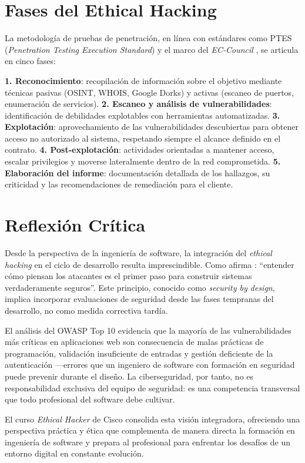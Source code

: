 \documentclass[12pt, a4paper]{article}
\begin{document}
\section{Fases del Ethical Hacking}

La metodología de pruebas de penetración, en línea con estándares como PTES (\textit{Penetration Testing Execution Standard}) y el marco del \textit{EC-Council} \citep{EC-Council2022}, se articula en cinco fases:

\textbf{1. Reconocimiento}: recopilación de información sobre el objetivo mediante técnicas pasivas (OSINT, WHOIS, Google Dorks) y activas (escaneo de puertos, enumeración de servicios). \textbf{2. Escaneo y análisis de vulnerabilidades}: identificación de debilidades explotables con herramientas automatizadas. \textbf{3. Explotación}: aprovechamiento de las vulnerabilidades descubiertas para obtener acceso no autorizado al sistema, respetando siempre el alcance definido en el contrato. \textbf{4. Post-explotación}: actividades orientadas a mantener acceso, escalar privilegios y moverse lateralmente dentro de la red comprometida. \textbf{5. Elaboración del informe}: documentación detallada de los hallazgos, su criticidad y las recomendaciones de remediación para el cliente.

\section{Reflexión Crítica}

Desde la perspectiva de la ingeniería de software, la integración del \textit{ethical hacking} en el ciclo de desarrollo resulta imprescindible. Como afirma \citet{Weidman2014}: ``entender cómo piensan los atacantes es el primer paso para construir sistemas verdaderamente seguros''. Este principio, conocido como \textit{security by design}, implica incorporar evaluaciones de seguridad desde las fases tempranas del desarrollo, no como medida correctiva tardía.

El análisis del OWASP Top 10 \citep{OWASP2021} evidencia que la mayoría de las vulnerabilidades más críticas en aplicaciones web son consecuencia de malas prácticas de programación, validación insuficiente de entradas y gestión deficiente de la autenticación —errores que un ingeniero de software con formación en seguridad puede prevenir durante el diseño. La ciberseguridad, por tanto, no es responsabilidad exclusiva del equipo de seguridad: es una competencia transversal que todo profesional del software debe cultivar.

El curso \textit{Ethical Hacker} de Cisco consolida esta visión integradora, ofreciendo una perspectiva práctica y ética que complementa de manera directa la formación en ingeniería de software y prepara al profesional para enfrentar los desafíos de un entorno digital en constante evolución.



\end{document}

